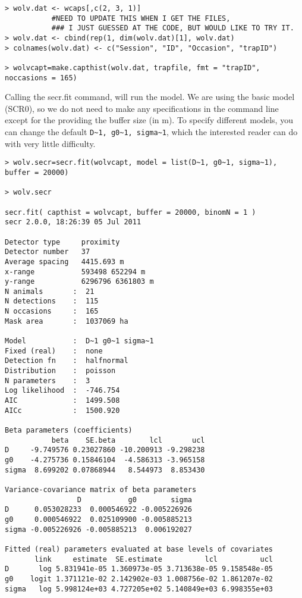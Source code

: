 \begin{verbatim}
> wolv.dat <- wcaps[,c(2, 3, 1)]   
           #NEED TO UPDATE THIS WHEN I GET THE FILES, 
           ### I JUST GUESSED AT THE CODE, BUT WOULD LIKE TO TRY IT. 
> wolv.dat <- cbind(rep(1, dim(wolv.dat)[1], wolv.dat)  
> colnames(wolv.dat) <- c("Session", "ID", "Occasion", "trapID")

> wolvcapt=make.capthist(wolv.dat, trapfile, fmt = "trapID", noccasions = 165)
\end{verbatim}

Calling the secr.fit command, will run the model.  We are using the
basic model (SCR0), so we do not need to make any specifications in
the command line except for the providing the buffer size (in m).  To
specify different models, you can change the default
\verb#D~1, g0~1, sigma~1#, which the interested reader can do with
very little difficulty.


\begin{verbatim}
> wolv.secr=secr.fit(wolvcapt, model = list(D~1, g0~1, sigma~1), buffer = 20000)

> wolv.secr

secr.fit( capthist = wolvcapt, buffer = 20000, binomN = 1 )
secr 2.0.0, 18:26:39 05 Jul 2011

Detector type     proximity 
Detector number   37 
Average spacing   4415.693 m 
x-range           593498 652294 m 
y-range           6296796 6361803 m 
N animals       :  21  
N detections    :  115 
N occasions     :  165 
Mask area       :  1037069 ha 

Model           :  D~1 g0~1 sigma~1 
Fixed (real)    :  none 
Detection fn    :  halfnormal 
Distribution    :  poisson 
N parameters    :  3 
Log likelihood  :  -746.754 
AIC             :  1499.508 
AICc            :  1500.920 

Beta parameters (coefficients) 
           beta    SE.beta        lcl       ucl
D     -9.749576 0.23027860 -10.200913 -9.298238
g0    -4.275736 0.15846104  -4.586313 -3.965158
sigma  8.699202 0.07868944   8.544973  8.853430

Variance-covariance matrix of beta parameters 
                 D           g0        sigma
D      0.053028233  0.000546922 -0.005226926
g0     0.000546922  0.025109900 -0.005885213
sigma -0.005226926 -0.005885213  0.006192027

Fitted (real) parameters evaluated at base levels of covariates 
       link     estimate  SE.estimate          lcl          ucl
D       log 5.831941e-05 1.360973e-05 3.713638e-05 9.158548e-05
g0    logit 1.371121e-02 2.142902e-03 1.008756e-02 1.861207e-02
sigma   log 5.998124e+03 4.727205e+02 5.140849e+03 6.998355e+03
\end{verbatim}

